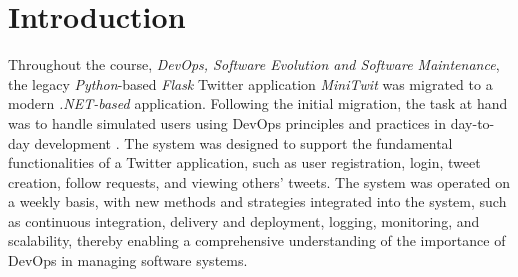 \chapter{Introduction}

Throughout the course, \textit{DevOps, Software Evolution and Software Maintenance}, the legacy \textit{Python}-based \textit{Flask} Twitter application \textit{MiniTwit} was migrated to a modern \textit{.NET-based} application. Following the initial migration, the task at hand was to handle simulated users using DevOps principles and practices in day-to-day development \cite{kim2016devops}. The system was designed to support the fundamental functionalities of a Twitter application, such as user registration, login, tweet creation, follow requests, and viewing others' tweets. The system was operated on a weekly basis, with new methods and strategies integrated into the system, such as continuous integration, delivery and deployment, logging, monitoring, and scalability, thereby enabling a comprehensive understanding of the importance of DevOps in managing software systems.

